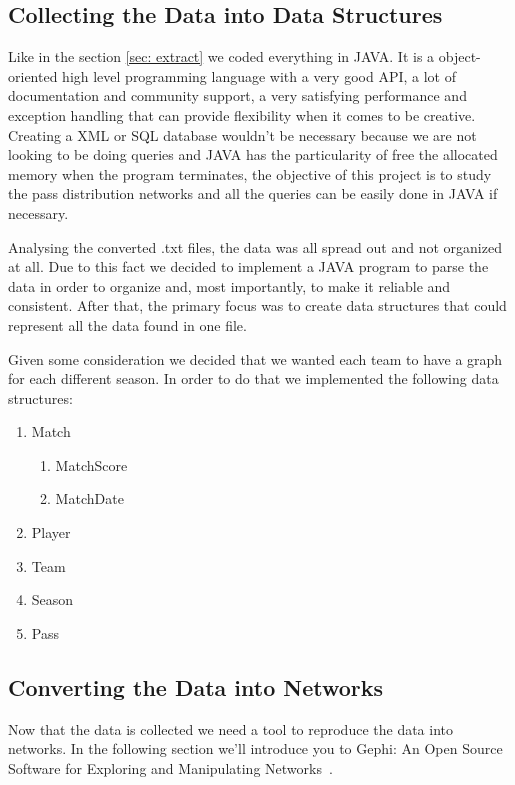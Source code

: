 \documentclass[12pt]{article}
\begin{document}
\subsection{Collecting the Data into Data Structures}\label{sec: collect}

Like in the section \ref{sec: extract} we coded everything in JAVA. It is a object-oriented high level programming language with a very good API, a lot of documentation and community support, a very satisfying performance and exception handling that can provide flexibility when it comes to be creative. Creating a XML or SQL database wouldn't be necessary because we are not looking to be doing queries and JAVA has the particularity of free the allocated memory when the program terminates, the objective of this project is to study the pass distribution networks and all the queries can be easily done in JAVA if necessary. 

Analysing the converted .txt files, the data was all spread out and not organized at all. Due to this fact we decided to implement a JAVA program to parse the data in order to organize and, most importantly, to make it reliable and consistent. After that, the primary focus was to create data structures that could represent all the data found in one file.

Given some consideration we decided that we wanted each team to have a graph for each different season. In order to do that we implemented the following data structures:
\begin{enumerate}
	\item{Match}
	\begin{enumerate}
		\item{MatchScore}
		\item{MatchDate}
	\end{enumerate}
	\item{Player}
	\item{Team}
	\item{Season}
	\item{Pass}
\end{enumerate}

\subsection{Converting the Data into Networks}\label{sec: convert}

Now that the data is collected we need a tool to reproduce the data into networks. In the following section we'll introduce you to Gephi: An Open Source Software for Exploring and Manipulating Networks~\cite{bastian2009gephi}.
\end{document}
